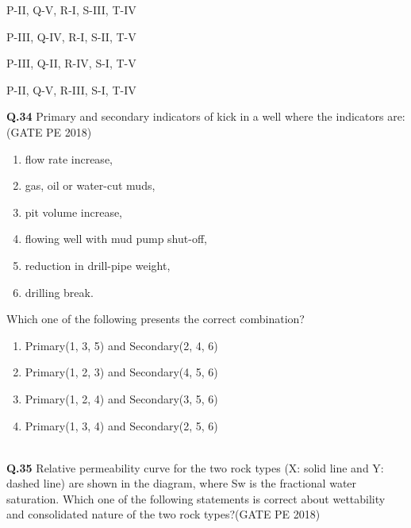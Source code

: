 \documentclass[12pt,a4paper]{article}
\begin{document}
\begin{enumerate}[label=(\Alph*)] 
\begin{multicols}{2}
\item P-II, Q-V, R-I, S-III, T-IV \item P-III, Q-IV, R-I, S-II, T-V \\
\item P-III, Q-II, R-IV, S-I, T-V \item P-II, Q-V, R-III, S-I, T-IV \\
\end{multicols}
\end{enumerate}

\vspace{0.7cm}

\noindent\textbf{Q.34} Primary and secondary indicators of kick in a well where the indicators are: \hfill (GATE PE 2018)

\begin{enumerate}
\item flow rate increase,
\item gas, oil or water-cut muds,
\item pit volume increase,
\item flowing well with mud pump shut-off,
\item reduction in drill-pipe weight,
\item drilling break.
\end{enumerate}

Which one of the following presents the correct combination?

\vspace{0.3cm}

\begin{enumerate}[label=(\Alph*)] 

\item Primary(1, 3, 5) and Secondary(2, 4, 6) \\
\item Primary(1, 2, 3) and Secondary(4, 5, 6) \\
\item Primary(1, 2, 4) and Secondary(3, 5, 6) \\
\item Primary(1, 3, 4) and Secondary(2, 5, 6) \\\\

\end{enumerate}
\pagebreak
\noindent
\textbf{Q.35} Relative permeability curve for the two rock types (X: solid line and Y: dashed line) are
shown in the diagram, where Sw is the fractional water saturation. Which one of the
following statements is correct about wettability and consolidated nature of the two rock
types?\hfill(GATE PE 2018)\\\\
\end{document}
